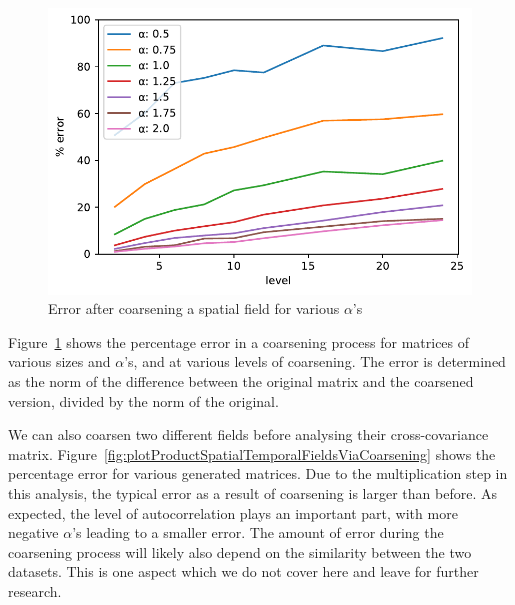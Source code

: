\documentclass{acm_proc_article-sp}
\begin{document}
\begin{figure}[h]
\begin{center}
\includegraphics[width=0.8\columnwidth]{Results/plotSingleSpatialFieldViaCoarsening.pdf}
\caption[Error after coarsening a spatial field]{Error after coarsening a spatial field for various $\alpha$'s}
\label{fig:plotSingleSpatialFieldViaCoarsening}
\end{center}
\end{figure}
Figure~\ref{fig:plotSingleSpatialFieldViaCoarsening} shows the percentage error in a coarsening process for matrices of various sizes and $\alpha$'s, and at various levels of coarsening. The error is determined as the norm of the difference between the original matrix and the coarsened version, divided by the norm of the original.

We can also coarsen two different fields before analysing their cross-covariance matrix. Figure~\ref{fig:plotProductSpatialTemporalFieldsViaCoarsening} shows the percentage error for various generated matrices.
Due to the multiplication step in this analysis, the typical error as a result of coarsening is larger than before. As expected, the level of autocorrelation plays an important part, with more negative $\alpha$'s leading to a smaller error. The amount of error during the coarsening process will likely also depend on the similarity between the two datasets. This is one aspect which we do not cover here and leave for further research.
\end{document}
